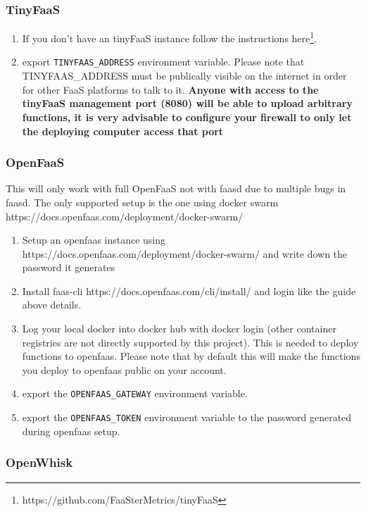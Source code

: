 \documentclass[../main.tex]{subfiles}
\begin{document}
\subsubsection{TinyFaaS}\label{sec:providersetuptinyfaas}

\begin{enumerate}
\item If you don't have an tinyFaaS instance follow the instructions here\footnote{https://github.com/FaaSterMetrics/tinyFaaS}.
\item export \texttt{TINYFAAS\_ADDRESS} environment variable. Please note that TINYFAAS\_ADDRESS must be publically visible on the internet in order for other FaaS platforms to talk to it. \textbf{Anyone with access to the tinyFaaS management port (8080) will be able to upload arbitrary functions, it is very advisable to configure your firewall to only let the deploying computer access that port}

\end{enumerate}

\subsubsection{OpenFaaS}\label{sec:providersetupazure}
This will only work with full OpenFaaS not with faasd due to multiple bugs in faasd.
The only supported setup is the one using docker swarm https://docs.openfaas.com/deployment/docker-swarm/
\begin{enumerate}
\item Setup an openfaas instance using https://docs.openfaas.com/deployment/docker-swarm/ and write down the password it generates
\item Install faas-cli https://docs.openfaas.com/cli/install/ and login like the guide above details.
\item Log your local docker into docker hub with docker login (other container registries are not directly supported by this project).
This is needed to deploy functions to openfaas. Please note that by default this will make the functions you deploy to openfaas public on your account.
\item export the \texttt{OPENFAAS\_GATEWAY} environment variable.
\item export the \texttt{OPENFAAS\_TOKEN} environment variable to the password generated during openfaas setup.
\end{enumerate}

\subsubsection{OpenWhisk}\label{sec:providersetupopenwhisk}
\end{document}
